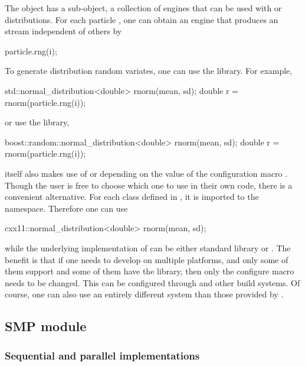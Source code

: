 The  object has a sub-object, a collection of \rng
engines that can be used with \cppoo{}  or \boost
distributions. For each particle , one can obtain an engine that
produces an \rng stream independent of others by
\begin{cppcode}
particle.rng(i);
\end{cppcode}
To generate distribution random variates, one can use the
\cppoo{}  library. For example,
\begin{cppcode}
std::normal_distribution<double> rnorm(mean, sd);
double r = rnorm(particle.rng(i));
\end{cppcode}
or use the \boost library,
\begin{cppcode}
boost::random::normal_distribution<double> rnorm(mean, sd);
double r = rnorm(particle.rng(i));
\end{cppcode}
\vsmc itself also makes use of \cppoo{}  or \boost
depending on the value of the configuration macro
. Though the user is free to choose which
one to use in their own code, there is a convenient alternative. For each
class defined in \cppoo{} , it is imported to the
 namespace. Therefore one can use
\begin{cppcode}
cxx11::normal_distribution<double> rnorm(mean, sd);
\end{cppcode}
while the underlying implementation of  can be
either \cppoo standard library or \boost. The benefit is that if one needs to
develop on multiple platforms, and only some of them support \cppoo and some
of them have the \boost library, then only the configure macro
 needs to be changed. This can be
configured through \cmake and other build systems. Of course, one can also use
an entirely different \rng system than those provided by \vsmc.

\subsection{SMP module}
\label{sub:SMP module}

\subsubsection{Sequential and parallel implementations}
\label{ssub:Sequential and parallel implementations}


